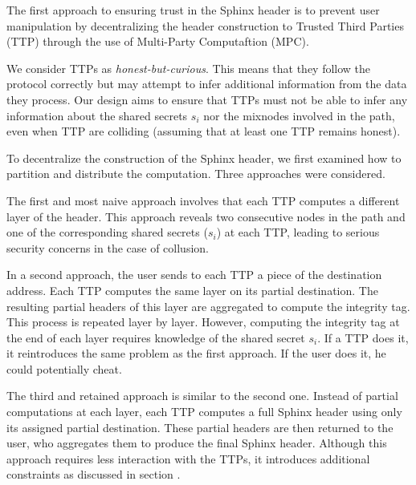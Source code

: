 The first approach to ensuring trust in the Sphinx header is to prevent user manipulation by decentralizing the header construction to Trusted Third Parties (TTP) through the use of Multi-Party Computaftion (MPC).

We consider TTPs as \textit{honest-but-curious}.
This means that they follow the protocol correctly but may attempt to infer additional information from the data they process.
Our design aims to ensure that TTPs must not be able to infer any information about the shared secrets $s_i$ nor the mixnodes involved in the path, even when TTP are colliding (assuming that at least one TTP remains honest).
\newline



To decentralize the construction of the Sphinx header, we first examined how to partition and distribute the computation. 
Three approaches were considered.

The first and most naive approach involves that each TTP computes a different layer of the header. 
This approach reveals two consecutive nodes in the path and one of the corresponding shared secrets ($s_i$) at each TTP, leading to serious security concerns in the case of collusion.

In a second approach, the user sends to each TTP a piece of the destination address.
Each TTP computes the same layer on its partial destination.
The resulting partial headers of this layer are aggregated to compute the integrity tag. 
This process is repeated layer by layer. 
However, computing the integrity tag at the end of each layer requires knowledge of the shared secret $s_i$. 
If a TTP does it, it reintroduces the same problem as the first approach.
If the user does it, he could potentially cheat.

The third and retained approach is similar to the second one.
Instead of partial computations at each layer, each TTP computes a full Sphinx header using only its assigned partial destination. 
These partial headers are then returned to the user, who aggregates them to produce the final Sphinx header.
Although this approach requires less interaction with the TTPs, it introduces additional constraints as discussed in section .

